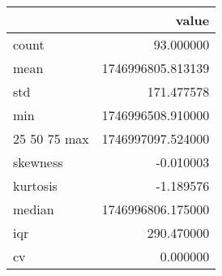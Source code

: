 \begin{tabular}{lr}
\toprule
 & value \\
\midrule
count & 93.000000 \\
mean & 1746996805.813139 \\
std & 171.477578 \\
min & 1746996508.910000 \\
25%
50%
75%
max & 1746997097.524000 \\
skewness & -0.010003 \\
kurtosis & -1.189576 \\
median & 1746996806.175000 \\
iqr & 290.470000 \\
cv & 0.000000 \\
\bottomrule
\end{tabular}
